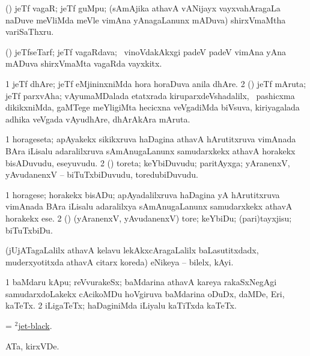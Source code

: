 \bentry
{}
\gl{\nA}
\bmng
(\AmA) jeTf vagaR; jeTf guMpu; (sAmAjika athavA vANijayx vayxvahAragaLa naDuve meVliMda meVle vimAna yAnagaLanunx mADuva) shirxVmaMtha variSaThxru. 
\emng
\eentry

\bentry
{}
\gl{\nA}
\bmng
(\AmA) jeTfseTarf; jeTf vagaRdava; \kanmu\ vinoVdakAkxgi padeV padeV vimAna yAna mADuva shirxVmaMta vagaRda vayxkitx. 
\emng
\eentry

\bentry
{}
\gl{\nA}
\bmng
\bnum
\num{1} jeTf dhAre; jeTf eMjininxniMda hora horaDuva anila dhAre. 
\num{2} (\pashA) jeTf mAruta; jeTf parxvAha; vAyumaMDalada etatxrada kiruparxdeVshadalilx, \sA\ pashicxma dikikxniMda, gaMTege  meYligiMta hecicxna veVgadiMda biVsuva, kiriyagalada adhika veVgada vAyudhAre, dhArAkAra mAruta. 
\enum
\emng
\eentry

\bentry
{}
\gl{\nA}
\bmng
\bnum
\num{1} horageseta; apAyakekx sikikxruva haDagina athavA hArutitxruva vimAnada BAra iLisalu adaralilxruva sAmAnugaLanunx samudarxkekx athavA horakekx bisADuvudu, eseyuvudu. 
\num{2} (\rUpa) toreta; keYbiDuvudu; paritAyxga; yAranenxV, yAvudanenxV -- biTuTxbiDuvudu, toredubiDuvudu. 
\enum
\emng
\eentry

\bentry
{}
\gl{\sakirx}
\bmng
\bnum
\num{1} horagese; horakekx bisADu; apAyadalilxruva haDagina yA hArutitxruva vimAnada BAra iLisalu adaralilxya sAmAnugaLanunx samudarxkekx athavA horakekx ese. 
\num{2} (\rUpa) (yAranenxV, yAvudanenxV) tore; keYbiDu; (pari)tayxjisu; biTuTxbiDu. 
\enum
\emng
\eentry

\bentry
{}
\gl{\nA}
\bmng
(jUjATagaLalilx athavA kelavu lekAkxcAragaLalilx baLasutitxdadx, muderxyotitxda athavA citarx koreda) eNikeya -- bilelx, kAyi. 
\emng
\eentry

\bentry
{}
\gl{\nA}
\bmng
\bnum
\num{1} baMdaru kApu; reVvurakeSx; baMdarina athavA kareya rakaSxNegAgi samudarxdoLakekx cAcikoMDu hoVgiruva baMdarina oDuDx, daMDe, Eri, kaTeTx. 
\num{2} iLigaTeTx; haDaginiMda iLiyalu kaTiTxda kaTeTx. 
\enum
\emng
\eentry

\bentry
{}
\gl{\gu}
\bmng
 = \hyperlink{jet-black(2)}{$^2$jet-black}. 
\emng
\eentry

\bentry
{}
\gl{\nA}
\bmng
ATa, kirxVDe. 
\emng
\eentry

